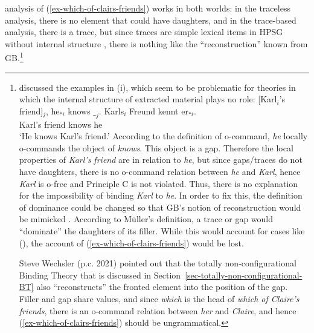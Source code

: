 \documentclass[output=paper,biblatex,babelshorthands,newtxmath,draftmode,colorlinks,citecolor=brown]{langscibook}
\begin{document}
 analysis of (\ref{ex-which-of-clairs-friends}) works in both worlds: in the
traceless analysis, there is no element that could have daughters, and in the trace-based analysis,
there is a trace, but since traces are simple lexical items in HPSG without internal structure \citep[164]{ps2}, there
is nothing like the ``reconstruction'' known from GB.\footnote{
\citet[Section~20.2]{Mueller99a} discussed the examples in (i), which seem to be problematic for
theories in which the internal structure of extracted material plays no role:
\eal
\ex {}[Karl$_i$'s friend]$_j$, he$_{*i}$ knows $\__j$.
\ex 
\gll Karls$_i$ Freund kennt er$_{*i}$.\\
     Karl's    friend knows he\\
\glt `He knows Karl's friend.'
\zl
According to the definition of o-command, \emph{he} locally o-commands the object of
\emph{knows}. This object is a gap. Therefore the local properties of \emph{Karl's
  friend} are in relation to \emph{he}, but since gaps/traces do not have daughters, there is no o-command
relation between \emph{he} and \emph{Karl}, hence \emph{Karl} is o-free and Principle C is not
violated. Thus, there is no explanation for the impossibility of binding \emph{Karl} to \emph{he}. In
order to fix this, the definition of dominance could be changed so that GB's notion of
reconstruction would be mimicked \citep[--410]{Mueller99a}. According to Müller's definition, a trace or gap
would ``dominate'' the daughters of its filler. While this would account for cases like (),
the account of (\ref{ex-which-of-clairs-friends}) would be lost.

Steve Wechsler (p.c. 2021) pointed out that the totally non-configurational Binding Theory
that is discussed in Section~\ref{sec-totally-non-configurational-BT} also ``reconstructs'' the
fronted element into the position of the gap. Filler and gap share \local values, and since
\emph{which} is the head of \emph{which of Claire's friends}, there is an o-command relation between
\emph{her} and \emph{Claire}, and hence (\ref{ex-which-of-clairs-friends}) should be ungrammatical.

}
\end{document}
